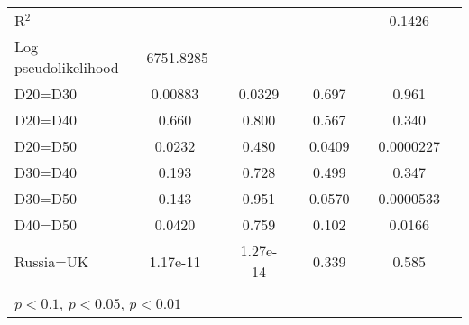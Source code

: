 \begin{tabular}{l|cccccc|cc}
R$^2$      &                  &         &                  &         &                  &         &    0.1426       &   \\ 
Log pseudolikelihood  &  -6751.8285  &         &                  &         &                  &         &           &   \\ 
D20=D30         &  0.00883         &         &   0.0329         &         &    0.697         &         &    0.961         &         \\
D20=D40         &    0.660         &         &    0.800         &         &    0.567         &         &    0.340         &         \\
D20=D50         &   0.0232         &         &    0.480         &         &   0.0409         &         &0.0000227         &         \\
D30=D40         &    0.193         &         &    0.728         &         &    0.499         &         &    0.347         &         \\
D30=D50         &    0.143         &         &    0.951         &         &   0.0570         &         &0.0000533         &         \\
D40=D50         &   0.0420         &         &    0.759         &         &    0.102         &         &   0.0166         &         \\
Russia=UK       & 1.17e-11         &         & 1.27e-14         &         &    0.339         &         &    0.585         &         \\
\hline\hline
\multicolumn{9}{p{16cm}}{\tiny }\\
\multicolumn{9}{l}{\tiny \sym{*} \(p<0.1\), \sym{**} \(p<0.05\), \sym{***} \(p<0.01\)}\\
\end{tabular}